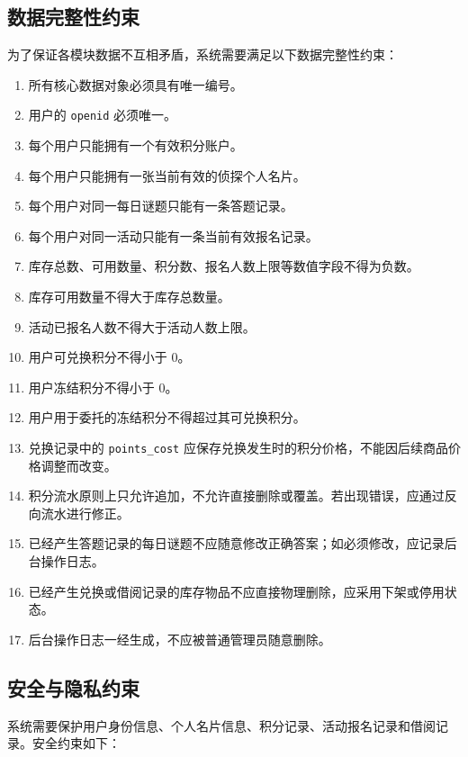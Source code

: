 \documentclass[a4paper,12pt]{article}
\begin{document}
\subsection{数据完整性约束}

为了保证各模块数据不互相矛盾，系统需要满足以下数据完整性约束：

\begin{enumerate}
    \item 所有核心数据对象必须具有唯一编号。
    \item 用户的 \texttt{openid} 必须唯一。
    \item 每个用户只能拥有一个有效积分账户。
    \item 每个用户只能拥有一张当前有效的侦探个人名片。
    \item 每个用户对同一每日谜题只能有一条答题记录。
    \item 每个用户对同一活动只能有一条当前有效报名记录。
    \item 库存总数、可用数量、积分数、报名人数上限等数值字段不得为负数。
    \item 库存可用数量不得大于库存总数量。
    \item 活动已报名人数不得大于活动人数上限。
    \item 用户可兑换积分不得小于 0。
    \item 用户冻结积分不得小于 0。
    \item 用户用于委托的冻结积分不得超过其可兑换积分。
    \item 兑换记录中的 \texttt{points\_cost} 应保存兑换发生时的积分价格，不能因后续商品价格调整而改变。
    \item 积分流水原则上只允许追加，不允许直接删除或覆盖。若出现错误，应通过反向流水进行修正。
    \item 已经产生答题记录的每日谜题不应随意修改正确答案；如必须修改，应记录后台操作日志。
    \item 已经产生兑换或借阅记录的库存物品不应直接物理删除，应采用下架或停用状态。
    \item 后台操作日志一经生成，不应被普通管理员随意删除。
\end{enumerate}

\subsection{安全与隐私约束}

系统需要保护用户身份信息、个人名片信息、积分记录、活动报名记录和借阅记录。安全约束如下：
\end{document}
